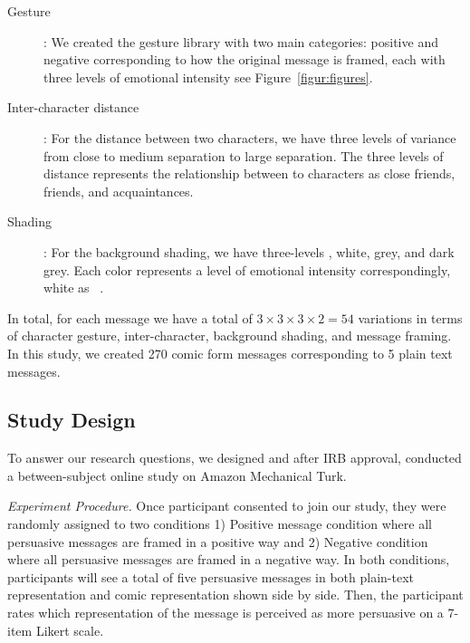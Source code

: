 \begin{description}
	\item[Gesture]: We created the gesture library with two main categories: positive and negative corresponding to how the original message is framed, each with three levels of emotional intensity see Figure~\ref{figur:figures}.
	\item[Inter-character distance]: For the distance between two characters, we have three levels of variance from close to medium separation to large separation. The three levels of distance represents the relationship between to characters as close friends, friends, and acquaintances.
	\item[Shading]: For the background shading, we have three-levels , white, grey, and dark grey. Each color represents a level of emotional intensity correspondingly, white as ~\cite{scott1993understanding}.
\end{description}



In total, for each message we have a total of $3 \times 3 \times 3 \times 2 =54$ variations in terms of character gesture, inter-character, background shading, and message framing. In this study, we created 270 comic form messages corresponding to 5 plain text messages.

\subsection{Study Design}
To answer our research questions, we designed and after IRB approval, conducted a between-subject online study on Amazon Mechanical Turk.

\textit{Experiment Procedure.} Once participant consented to join our study, they were randomly assigned to two conditions 1) Positive message condition where all persuasive messages are framed in a positive way and 2) Negative condition where all persuasive messages are framed in a negative way. In both conditions, participants will see a total of five persuasive messages in both plain-text representation and comic representation shown side by side. Then, the participant rates which representation of the message is perceived as more persuasive on a 7-item Likert scale.

